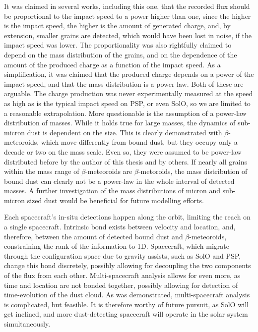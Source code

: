 It was claimed in several works, including this one, that the recorded flux should be proportional to the impact speed to a power higher than one, since the higher is the impact speed, the higher is the amount of generated charge, and, by extension, smaller grains are detected, which would have been lost in noise, if the impact speed was lower. The proportionality was also rightfully claimed to depend on the mass distribution of the grains, and on the dependence of the amount of the produced charge as a function of the impact speed. As a simplification, it was claimed that the produced charge depends on a power of the impact speed, and that the mass distribution is a power-law. Both of these are arguable. The charge production was never experimentally measured at the speed as high as is the typical impact speed on PSP, or even SolO, so we are limited to a reasonable extrapolation. More questionable is the assumption of a power-law distribution of masses. While it holds true for large masses, the dynamics of sub-micron dust is dependent on the size. This is clearly demonstrated with $\beta$-meteoroids, which move differently from bound dust, but they occupy only a decade or two on the mass scale. Even so, they were assumed to be power-law distributed before by the author of this thesis and by others. If nearly all grains within the mass range of $\beta$-meteoroids are $\beta$-metoroids, the mass distribution of bound dust can clearly not be a power-law in the whole interval of detected masses. A further investigation of the mass distributions of micron and sub-micron sized dust would be beneficial for future modelling efforts.

Each spacecraft's in-situ detections happen along the orbit, limiting the reach on a single spacecraft. Intrinsic bond exists between velocity and location, and, therefore, between the amount of detected bound dust and $\beta$-meteoroids, constraining the rank of the information to 1D. Spacecraft, which migrate through the configuration space due to gravity assists, such as SolO and PSP, change this bond discretely, possibly allowing for decoupling the two components of the flux from each other. Multi-spacecraft analysis allows for even more, as time and location are not bonded together, possibly allowing for detection of time-evolution of the dust cloud. As was demonstrated, multi-spacecraft analysis is complicated, but feasible. It is therefore worthy of future pursuit, as SolO will get inclined, and more dust-detecting spacecraft will operate in the solar system simultaneously. 